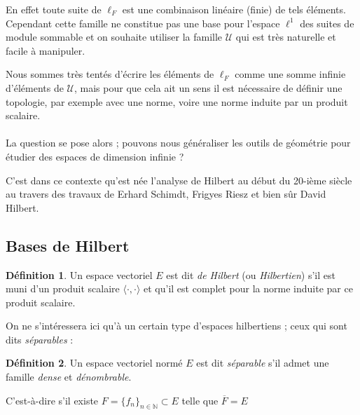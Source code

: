\documentclass[]{article}
\theoremstyle{remark}
\theoremstyle{definition}
\newtheorem{mydef}{Définition}
\begin{document}
	En effet toute suite de $\ell_F$ est une combinaison linéaire (finie) de tels éléments. Cependant cette famille ne constitue pas une base pour l'espace $\ell^1$ des suites de module sommable et on souhaite utiliser la famille $\mathcal{U}$ qui est très naturelle et facile à manipuler.
	
	Nous sommes très tentés d'écrire les éléments de $\ell_F$ comme une somme infinie d'éléments de $\mathcal{U}$, mais pour que cela ait un sens il est nécessaire de définir une topologie, par exemple avec une norme, voire une norme induite par un produit scalaire.
	
	\paragraph*{}
	
	La question se pose alors ; pouvons nous généraliser les outils de géométrie pour étudier des espaces de dimension infinie ?
	
	C'est dans ce contexte qu'est née l'analyse de Hilbert au début du 20-ième siècle au travers des travaux de Erhard Schimdt, Frigyes Riesz et bien sûr David Hilbert.
	
	\subsection{Bases de Hilbert}
	
	\begin{mydef}
		Un espace vectoriel $E$ est dit \textit{de Hilbert} (ou \textit{Hilbertien}) s'il est muni d'un produit scalaire $\langle \cdot, \cdot \rangle$ et qu'il est complet pour la norme induite par ce produit scalaire.
	\end{mydef}
	
	On ne s'intéressera ici qu'à un certain type d'espaces hilbertiens ; ceux qui sont dits \textit{séparables} :
	
	\begin{mydef}
		Un espace vectoriel normé $E$ est dit \textit{séparable} s'il admet une famille \textit{dense} et \textit{dénombrable}.
		
		C'est-à-dire s'il existe $F = \{f_n\}_{n \in \mathbb{N}} \subset E$ telle que $\overline{F} = E$
	\end{mydef}
	
\end{document}
